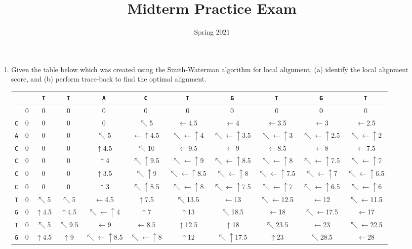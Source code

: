 \documentclass[11pt, oneside]{article}   	%
\title{Midterm Practice Exam}
\author{Spring 2021}
\newcommand{\diru}{$\uparrow$}
\newcommand{\dirl}{$\leftarrow$}
\newcommand{\dird}{$\nwarrow$}
\newcommand{\dirdl}{$\nwarrow\leftarrow$}
\newcommand{\dirdu}{$\nwarrow\uparrow$}
\newcommand{\dirlu}{$\leftarrow\uparrow$}
\newcommand{\dirdlu}{$\nwarrow\leftarrow\uparrow$}
\begin{document}
\maketitle
\begin{enumerate}
\item Given the table below which was created using the Smith-Waterman algorithm for local alignment, (a) identify the local alignment score, and (b) perform trace-back to find the optimal alignment. 

{\footnotesize
\begin{tabular}{|c||c|c|c|c|c|c|c|c|c|c|}

\hline
& & \texttt{T} &  \texttt{T} &  \texttt{A} &  \texttt{C} &  \texttt{T} &  \texttt{G} &  \texttt{T} &  \texttt{G} &  \texttt{T} \\
\hline
\hline
&  0 &	 0 &	0 &	0 &	0 &	0 &	0 &	0 &	0 &	0 \\
\hline
\texttt{C} &  0 &	0  &	0 &	0 &	\dird 5 &	\dirl 4.5 &		\dirl 4 &	\dirl 3.5 &		\dirl 3 &	\dirl 2.5 \\
\hline 
\texttt{A} &  0 & 0 & 0 &  \dird 5 & \dirlu 4.5 &		\dirdlu 4 &	\dirdlu 3.5 &		\dirdlu 3 &	\dirdlu 2.5 &		\dirdlu 2 \\
\hline
\texttt{C} &  0 & 0 & 0 & \diru 4.5 &  \dird 10 & \dirl 9.5 & \dirl 9 & \dirl 8.5 & \dirl 8 & \dirl 7.5 \\
\hline 
\texttt{C} &  0 & 0 & 0 & \diru 4 & \dirdu 9.5 & \dirdlu 9 & \dirdlu 8.5 & \dirdlu 8 & \dirdlu 7.5 & \dirdlu 7 \\
\hline 
\texttt{C} & 0 & 0 & 0 & \diru 3.5 &  \dirdu 9 & \dirdlu 8.5 & \dirdlu 8 & \dirdlu 7.5 & \dirdlu 7 & \dirdlu 6.5 \\
\hline 
\texttt{C} &  0 & 0 & 0 & \diru 3 &   \dirdu 8.5 & \dirdlu 8 & \dirdlu 7.5 & \dirdlu 7 & \dirdlu 6.5 & \dirdlu 6 \\
\hline  
\texttt{T} &  0 & \dird 5 & \dird 5 & \dirl 4.5 & \diru 7.5 & \dird 13.5 & \dirl 13 & \dirdl 12.5 & \dirl 12 & \dirdl 11.5  \\
\hline 
\texttt{G} &  0 & \diru 4.5 & \diru 4.5 & \dirdlu 4 & \diru 7 & \diru 13 &  \dird 18.5 & \dirl 18 & \dirdl 17.5 & \dirl 17 \\
\hline 
\texttt{T} &  0 & \dird 5 & \dird 9.5 & \dirl 9 & \dirl 8.5 & \diru 12.5 & \diru 18 &  \dird 23.5 & \dirl 23 & \dirdl 22.5 \\
\hline 
\texttt{G} &  0 & \diru 4.5 & \diru 9 & \dirdlu 8.5 & \dirdlu 8 & \diru 12 & \dirdu 17.5 & \diru 23 &  \dird 28.5 &  \dirl 28 \\
\hline 
\end{tabular}
}


\end{enumerate}
\end{document}
